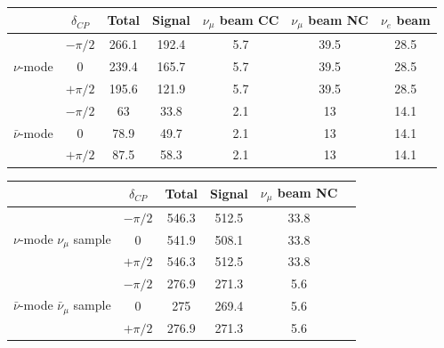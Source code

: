 \documentclass[a4 paper,12pt]{report}%
\begin{document}
\begin{center}
\label{tab:novanue}
\begin{tabular}{|c| c| c| c| c| c| c|}
\hline
& $\delta_{CP}$ & Total & Signal & $\nu_\mu$ beam CC   & $\nu_\mu$ beam NC  & $\nu_e$ beam \\ 
 \hline  
\multirow{3}{*}{$\nu$-mode}  &$-\pi/2$& 266.1 & 192.4 & 5.7 & 39.5 & 28.5 \\
 \multirow{3}{*}{$\nu_e$ sample}   & $0$ & 239.4 & 165.7 & 5.7 & 39.5 & 28.5 \\ 
&$+\pi/2$&  195.6 & 121.9 & 5.7 & 39.5 & 28.5 \\

\hline 
\multirow{3}{*}{$\bar{\nu}$-mode }&$-\pi/2$&  63 & 33.8 & 2.1 & 13  & 14.1 \\
\multirow{3}{*}{ $\bar{\nu}_e$ sample}&0 & 78.9 & 49.7 & 2.1 & 13 & 14.1 \\ 
& $+\pi/2$& 87.5 & 58.3 & 2.1 & 13  & 14.1  \\

\hline 
\end{tabular} 
\end{center}

\begin{center}
\label{tab:novanumu}
\begin{tabular}{|c| c| c| c| c| c|}
\hline
& $\delta_{CP}$ & Total & Signal & $\nu_\mu$ beam NC \\ 
 \hline  
  \multirow{3}{*}{ $\nu$-mode $\nu_\mu$ sample} & $-\pi/2$ & 546.3 & 512.5 & 33.8 \\
  &$0$ & 541.9 & 508.1 & 33.8 \\ 
  &$+\pi/2$ & 546.3 & 512.5 & 33.8 \\ 

\hline 
\multirow{3}{*}{ $\bar{\nu}$-mode $\bar{\nu}_\mu$ sample} &$-\pi/2$ & 276.9 & 271.3 & 5.6  \\
  &$0$ & 275 & 269.4 & 5.6  \\ 
    &$+\pi/2$ & 276.9 & 271.3 & 5.6  \\ 
\hline 
\end{tabular} 
\end{center}
\end{document}

